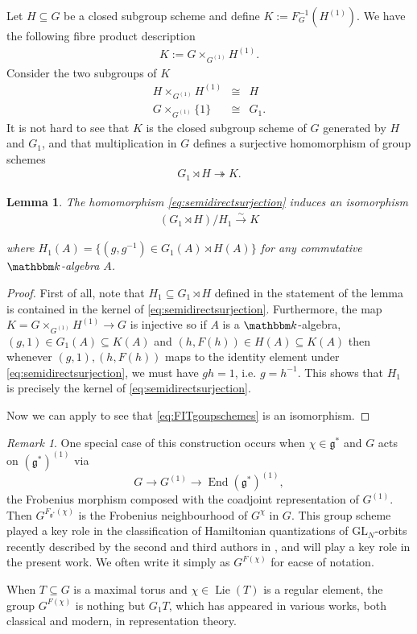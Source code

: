 \documentclass[twoside,12pt,reqno]{amsart}
\newtheorem{Lemma}[Theorem]{Lemma}
\theoremstyle{remark}
\newtheorem{Remark}[Theorem]{Remark}
\numberwithin{equation}{section}
\def\onto{\twoheadrightarrow}
\def\isoto{\overset{\sim}{\longrightarrow}}
\def\k{{\mathbbm k}}
\def\Lie{\operatorname{Lie}}
\def\End{\operatorname{End}}
\def\GL{\mathrm{GL}}
\def\g{{\mathfrak g}}
\begin{document}
Let $H \subseteq G$ be a closed subgroup scheme and define $K:= F_G^{-1}(H^{(1)})$. We have the following fibre product description
\begin{eqnarray}\label{e:defineK}
    K := G \times_{G^{(1)}} H^{(1)}.
\end{eqnarray}
Consider the two subgroups of $K$
\begin{eqnarray}
    H \times_{G^{(1)}} H^{(1)} & \cong & H\\
    G \times_{G^{(1)}} \{1\} & \cong & G_1.
\end{eqnarray}
It is not hard to see that $K$ is the closed subgroup scheme of $G$ generated by $H$ and $G_1$, and that multiplication in $G$ defines a surjective homomorphism of group schemes
\begin{eqnarray}
\label{eq:semidirectsurjection}
    G_1 \rtimes H \onto K.
\end{eqnarray}
\begin{Lemma}\label{L:semidir}
    The homomorphism \eqref{eq:semidirectsurjection} induces an isomorphism
    \begin{eqnarray}
        \label{eq:FITgoupschemes}
        (G_1 \rtimes H) / H_1 \isoto K
    \end{eqnarray}
    
    where $H_1(A) = \{(g,g^{-1}) \in G_1(A) \rtimes H(A)\}$ for any commutative $\k$-algebra $A$.
\end{Lemma}
\begin{proof}
    First of all, note that $H_1 \subseteq G_1 \rtimes H$ defined in the statement of the lemma is contained in the kernel of \eqref{eq:semidirectsurjection}. Furthermore, the map $K = G \times_{G^{(1)}} H^{(1)} \to G$ is injective so if $A$ is a $\k$-algebra, $(g,1) \in G_1(A) \subseteq K(A)$ and $(h, F(h)) \in H(A) \subseteq K(A)$ then whenever $(g,1) , (h, F(h))$ maps to the identity element under \eqref{eq:semidirectsurjection}, we must have $gh = 1$, i.e. $g = h^{-1}$. This shows that $H_1$ is precisely the kernel of \eqref{eq:semidirectsurjection}.

    Now we can apply \cite[Theorem~IX.3.1]{Mi} to see that \eqref{eq:FITgoupschemes} is an isomorphism.
\end{proof}

\begin{Remark}
One special case of this construction occurs when $\chi \in \g^*$ and $G$ acts on $(\g^*)^{(1)}$ via $$G \to G^{(1)} \to \End (\g^*)^{(1)},$$ the Frobenius morphism composed with the coadjoint representation of $G^{(1)}$. Then $G^{F_{\g^*}(\chi)}$ is the Frobenius neighbourhood of $G^\chi$ in $G$. This group scheme played a key role in the classification of Hamiltonian quantizations of $\GL_N$-orbits recently described by the second and third authors in \cite{ATW}, and will play a key role in the present work. We often write it simply as $G^{F(\chi)}$ for eacse of notation.

When $T \subseteq G$ is a maximal torus and $\chi \in \Lie(T)$ is a regular element, the group $G^{F(\chi)}$ is nothing but $G_1T$, which has appeared in various works, both classical and modern, in representation theory.
\end{Remark}
\end{document}
